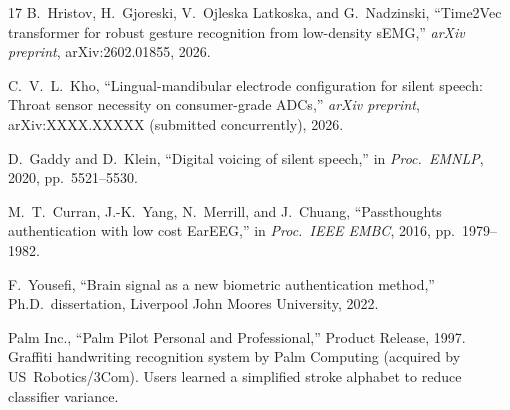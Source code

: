 \documentclass{article}
\begin{document}
\begin{thebibliography}{17}
B.\ Hristov, H.\ Gjoreski, V.\ Ojleska Latkoska, and G.\ Nadzinski, ``Time2Vec transformer for robust gesture recognition from low-density sEMG,'' \emph{arXiv preprint}, arXiv:2602.01855, 2026.

C.~V.~L.\ Kho, ``Lingual-mandibular electrode configuration for silent speech: Throat sensor necessity on consumer-grade ADCs,'' \emph{arXiv preprint}, arXiv:XXXX.XXXXX (submitted concurrently), 2026.

D.\ Gaddy and D.\ Klein, ``Digital voicing of silent speech,'' in \emph{Proc.\ EMNLP}, 2020, pp.\ 5521--5530.

M.~T.\ Curran, J.-K.\ Yang, N.\ Merrill, and J.\ Chuang, ``Passthoughts authentication with low cost EarEEG,'' in \emph{Proc.\ IEEE EMBC}, 2016, pp.\ 1979--1982.

F.\ Yousefi, ``Brain signal as a new biometric authentication method,'' Ph.D.\ dissertation, Liverpool John Moores University, 2022.

Palm Inc., ``Palm Pilot Personal and Professional,'' Product Release, 1997. Graffiti handwriting recognition system by Palm Computing (acquired by US~Robotics/3Com). Users learned a simplified stroke alphabet to reduce classifier variance.

\end{thebibliography}
\end{document}

